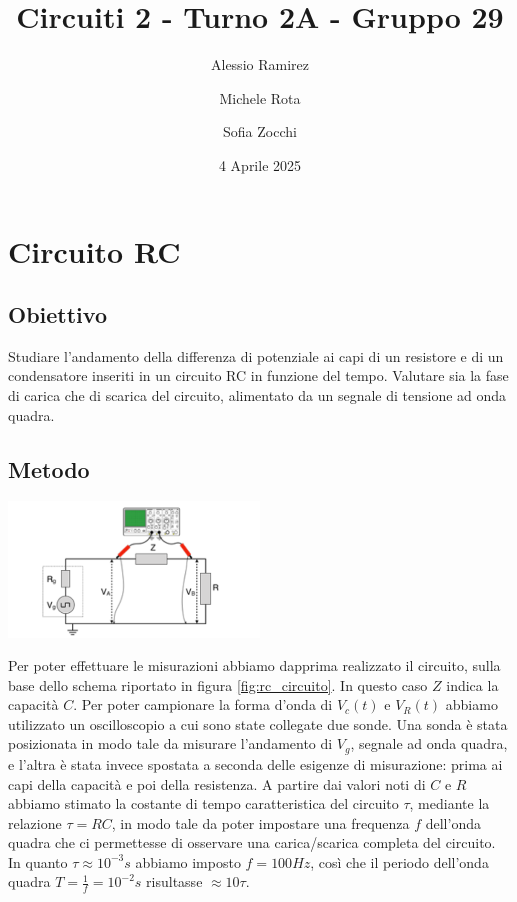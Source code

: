 \documentclass[a4paper]{article}
\title{Circuiti 2 - Turno 2A - Gruppo 29}
\author{Alessio Ramirez \and Michele Rota \and Sofia Zocchi}
\date{4 Aprile 2025}
\begin{document}
\maketitle
\tableofcontents
\newpage

\section{Circuito RC}
\subsection{Obiettivo}
Studiare l'andamento della differenza di potenziale ai capi di un resistore e di un condensatore inseriti in un circuito RC in funzione del tempo. Valutare sia la fase di carica che di scarica del circuito, alimentato da un segnale di tensione ad onda quadra.
\subsection{Metodo}
\begin{center}
	\includegraphics[width=0.5\textwidth]{grafici/circuito-rc.png}
	\label{fig:rc_circuito}
\end{center}
Per poter effettuare le misurazioni abbiamo dapprima realizzato il circuito, sulla base dello schema riportato in figura \ref{fig:rc_circuito}. In questo caso $Z$ indica la capacità $C$. Per poter campionare la forma d'onda di $V_c (t)$ e $V_R (t)$ abbiamo utilizzato un oscilloscopio a cui sono state collegate due sonde. Una sonda è stata posizionata in modo tale da misurare l'andamento di $V_g$, segnale ad onda quadra, e l'altra è stata invece spostata a seconda delle esigenze di misurazione: prima ai capi della capacità e poi della resistenza. A partire dai valori noti di $C$ e $R$ abbiamo stimato la costante di tempo caratteristica del circuito $\tau$, mediante la relazione \( \mathit{\tau = RC} \), in modo tale da poter impostare una frequenza $f$ dell'onda quadra che ci permettesse di osservare una carica/scarica completa del circuito. In quanto \(\tau \approx 10^{-3} s\) abbiamo imposto $f = 100 Hz$, così che il periodo dell'onda quadra \( \mathit{T = \frac{1}{f} = 10^{-2} s}\) risultasse $\approx10\tau$.
\end{document}
